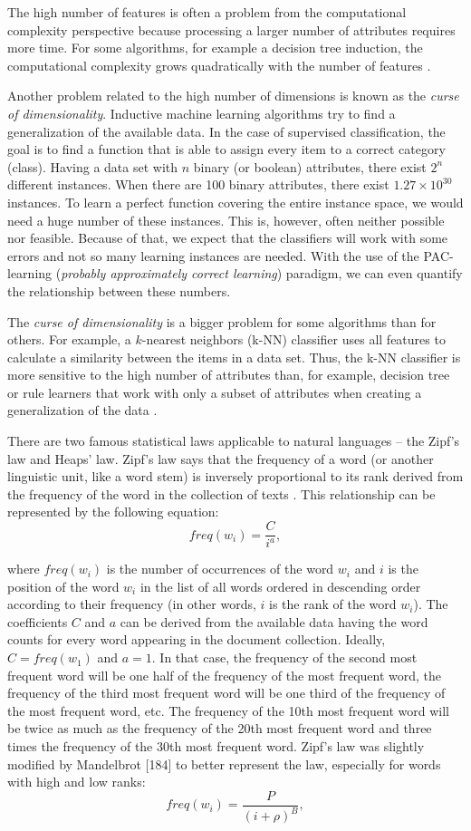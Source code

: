 The high number of features is often a problem from the computational complexity perspective because processing a larger number of attributes requires
more time. For some algorithms, for example a decision tree induction, the computational complexity grows quadratically with the number of features \cite{ref144}.

Another problem related to the high number of dimensions is known as the
\textit{curse of dimensionality}. Inductive machine learning algorithms try to find a
generalization of the available data. In the case of supervised classification, the goal
is to find a function that is able to assign every item to a correct category (class).
Having a data set with $n$ binary (or boolean) attributes, there exist $2^n$ different
instances. When there are 100 binary attributes, there exist $1.27 \times 10^{30}$ instances.
To learn a perfect function covering the entire instance space, we would need a
huge number of these instances. This is, however, often neither possible nor feasible.
Because of that, we expect that the classifiers will work with some errors and not so
many learning instances are needed. With the use of the PAC-learning
(\textit{probably approximately correct learning}) paradigm, we can even quantify the
relationship between these numbers\cite{ref150}.

The \textit{curse of dimensionality} is a bigger problem for some algorithms than for
others. For example, a $k$-nearest neighbors (k-NN) classifier uses all features to
calculate a similarity between the items in a data set. Thus, the k-NN classifier
is more sensitive to the high number of attributes than, for example, decision
tree or rule learners that work with only a subset of attributes when creating a
generalization of the data \cite{ref199}.

There are two famous statistical laws applicable to natural languages – the
Zipf’s law and Heaps’ law. Zipf’s law says that the frequency of a word (or another
linguistic unit, like a word stem) is inversely proportional to its rank derived
from the frequency of the word in the collection of texts \cite{ref186}. This relationship
can be represented by the following equation:
\[
freq(w_i) = \frac{C}{i^a},
\tag{3.1}
\]

where $freq(w_i)$ is the number of occurrences of the word $w_i$ and $i$ is the position of the word $w_i$
in the list of all words ordered in descending order according
to their frequency (in other words, $i$ is the rank of the word $w_i$). The coefficients
$C$ and $a$ can be derived from the available data having the word counts for every
word appearing in the document collection. Ideally, $C = freq(w_1)$ and $a = 1$. In
that case, the frequency of the second most frequent word will be one half of the
frequency of the most frequent word, the frequency of the third most frequent
word will be one third of the frequency of the most frequent word, etc. The frequency
of the 10th most frequent word will be twice as much as the frequency
of the 20th most frequent word and three times the frequency of the 30th most
frequent word. Zipf’s law was slightly modified by Mandelbrot [184] to better
represent the law, especially for words with high and low ranks:
\[
freq(w_i) = \frac{P}{(i + \rho)^B},
\tag{3.2}
\]

